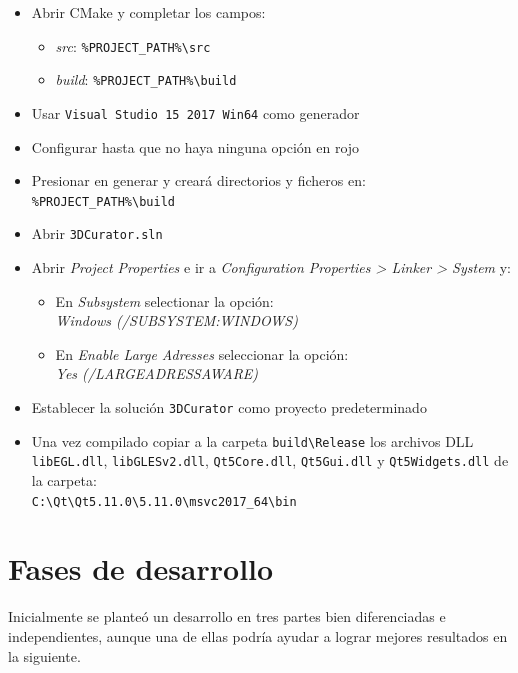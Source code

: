 \begin{itemize}
	\item Abrir CMake y completar los campos:
	\begin{itemize}
		\item \textit{src}: \texttt{\%PROJECT\_PATH\%\textbackslash src}
		\item \textit{build}: \texttt{\%PROJECT\_PATH\%\textbackslash build}
	\end{itemize}
	\item Usar \texttt{Visual Studio 15 2017 Win64} como generador
	\item Configurar hasta que no haya ninguna opción en rojo
	\item Presionar en generar y creará directorios y ficheros en: \\ \texttt{\%PROJECT\_PATH\%\textbackslash build}
	\item Abrir \texttt{3DCurator.sln}
	\item Abrir \textit{Project Properties} e ir a \textit{Configuration Properties > Linker > System} y:
	\begin{itemize}
		\item En \textit{Subsystem} selectionar la opción: \\ \textit{Windows (/SUBSYSTEM:WINDOWS)}
		\item En \textit{Enable Large Adresses} seleccionar la opción: \\ \textit{Yes (/LARGEADRESSAWARE)}
	\end{itemize}
	\item Establecer la solución \texttt{3DCurator} como proyecto predeterminado
	\item Una vez compilado copiar a la carpeta \texttt{build\textbackslash Release} los archivos DLL \texttt{libEGL.dll}, \texttt{libGLESv2.dll}, \texttt{Qt5Core.dll}, \texttt{Qt5Gui.dll} y \texttt{Qt5Widgets.dll} de la carpeta: \\ \texttt{C:\textbackslash Qt\textbackslash Qt5.11.0\textbackslash 5.11.0\textbackslash msvc2017\_64\textbackslash bin}
\end{itemize}

\section{Fases de desarrollo}

Inicialmente se planteó un desarrollo en tres partes bien diferenciadas e independientes, aunque una de ellas podría ayudar a lograr mejores resultados en la siguiente. 

